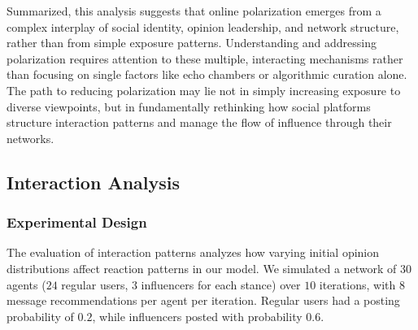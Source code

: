 

Summarized, this analysis suggests that online polarization emerges from a complex interplay of social identity, opinion leadership, and network structure, rather than from simple exposure patterns. Understanding and addressing polarization requires attention to these multiple, interacting mechanisms rather than focusing on single factors like echo chambers or algorithmic curation alone. The path to reducing polarization may lie not in simply increasing exposure to diverse viewpoints, but in fundamentally rethinking how social platforms structure interaction patterns and manage the flow of influence through their networks.



\subsection{Interaction Analysis}

\subsubsection{Experimental Design}
The evaluation of interaction patterns analyzes how varying initial opinion distributions affect reaction patterns in our model. We simulated a network of $30$ agents ($24$ regular users, $3$ influencers for each stance) over $10$ iterations, with $8$ message recommendations per agent per iteration. Regular users had a posting probability of $0.2$, while influencers posted with probability $0.6$.

